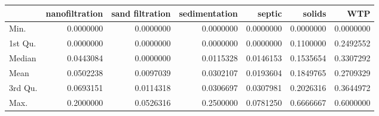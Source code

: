 \documentclass[
]{article}
\newenvironment{Shaded}{\begin{snugshade}}{\end{snugshade}}
\newcommand{\DataTypeTok}[1]{\textcolor[rgb]{0.13,0.29,0.53}{#1}}
\newcommand{\KeywordTok}[1]{\textcolor[rgb]{0.13,0.29,0.53}{\textbf{#1}}}
\newcommand{\NormalTok}[1]{#1}
\newcommand{\OperatorTok}[1]{\textcolor[rgb]{0.81,0.36,0.00}{\textbf{#1}}}
\newcommand{\StringTok}[1]{\textcolor[rgb]{0.31,0.60,0.02}{#1}}
\begin{document}
\begin{longtable}[]{@{}lrrrrrr@{}}
\toprule
& nanofiltration & sand filtration & sedimentation & septic & solids &
WTP\tabularnewline
\midrule
\endhead
Min. & 0.0000000 & 0.0000000 & 0.0000000 & 0.0000000 & 0.0000000 &
0.0000000\tabularnewline
1st Qu. & 0.0000000 & 0.0000000 & 0.0000000 & 0.0000000 & 0.1100000 &
0.2492552\tabularnewline
Median & 0.0443084 & 0.0000000 & 0.0115328 & 0.0146153 & 0.1535654 &
0.3307292\tabularnewline
Mean & 0.0502238 & 0.0097039 & 0.0302107 & 0.0193604 & 0.1849765 &
0.2709329\tabularnewline
3rd Qu. & 0.0693151 & 0.0114318 & 0.0306697 & 0.0307981 & 0.2026316 &
0.3644972\tabularnewline
Max. & 0.2000000 & 0.0526316 & 0.2500000 & 0.0781250 & 0.6666667 &
0.6000000\tabularnewline
\bottomrule
\end{longtable}

\begin{Shaded}
\end{Shaded}
\end{document}
